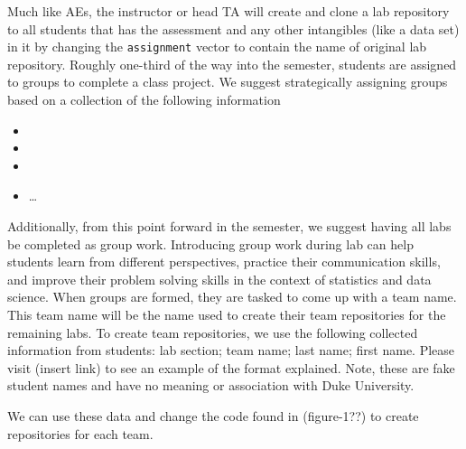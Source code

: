 \documentclass[
  12pt]{article}
\newenvironment{Shaded}{\begin{snugshade}}{\end{snugshade}}
\newcommand{\AttributeTok}[1]{\textcolor[rgb]{0.40,0.45,0.13}{#1}}
\newcommand{\CommentTok}[1]{\textcolor[rgb]{0.37,0.37,0.37}{#1}}
\newcommand{\FunctionTok}[1]{\textcolor[rgb]{0.28,0.35,0.67}{#1}}
\newcommand{\NormalTok}[1]{\textcolor[rgb]{0.00,0.23,0.31}{#1}}
\newcommand{\OtherTok}[1]{\textcolor[rgb]{0.00,0.23,0.31}{#1}}
\newcommand{\SpecialCharTok}[1]{\textcolor[rgb]{0.37,0.37,0.37}{#1}}
\newcommand{\StringTok}[1]{\textcolor[rgb]{0.13,0.47,0.30}{#1}}
\providecommand{\tightlist}{%
  \setlength{\itemsep}{0pt}\setlength{\parskip}{0pt}}\usepackage{longtable,booktabs,array}
\begin{document}
Much like AEs, the instructor or head TA will create and clone a lab
repository to all students that has the assessment and any other
intangibles (like a data set) in it by changing the \texttt{assignment}
vector to contain the name of original lab repository. Roughly one-third
of the way into the semester, students are assigned to groups to
complete a class project. We suggest strategically assigning groups
based on a collection of the following information

\begin{itemize}
\tightlist
\item
\item
\item
\item
  \ldots{}
\end{itemize}

Additionally, from this point forward in the semester, we suggest having
all labs be completed as group work. Introducing group work during lab
can help students learn from different perspectives, practice their
communication skills, and improve their problem solving skills in the
context of statistics and data science. When groups are formed, they are
tasked to come up with a team name. This team name will be the name used
to create their team repositories for the remaining labs. To create team
repositories, we use the following collected information from students:
lab section; team name; last name; first name. Please visit (insert
link) to see an example of the format explained. Note, these are fake
student names and have no meaning or association with Duke University.

We can use these data and change the code found in (figure-1??) to
create repositories for each team.

\begin{Shaded}
\end{Shaded}
\end{document}
